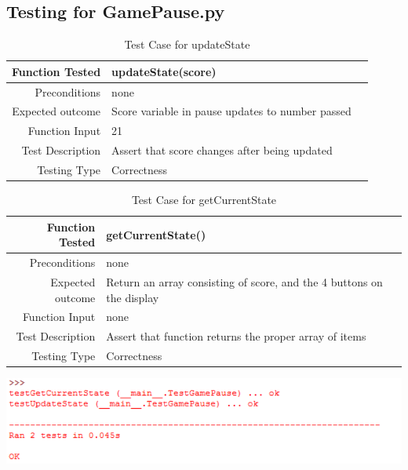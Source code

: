 \documentclass[12pt]{article}
\begin{document}
\subsection{Testing for GamePause.py}
\begin{center}
	\begin{longtable}{ | r | p{4cm} | p{4cm} }
	\caption{Test Case for updateState} \\ \hline \label{TblInputVar} 
	Function Tested & updateState(score)\\ \hline
	Preconditions & none \\ \hline
	Expected outcome & Score variable in pause updates to number passed  \\ \hline
	Function Input & 21 \\ \hline
	Test Description & Assert that score changes after being updated\\ \hline
	Testing Type & Correctness\\ \hline
	
	\end{longtable}
\end{center}

\begin{center}
	\begin{longtable}{ | r | p{4cm} | p{4cm} }
	\caption{Test Case for getCurrentState} \\ \hline \label{TblInputVar} 
	Function Tested & getCurrentState()\\ \hline
	Preconditions & none \\ \hline
	Expected outcome & Return an array consisting of score, and the 4 buttons on the display  \\ \hline
	Function Input & none \\ \hline
	Test Description & Assert that function returns the proper array of items \\ \hline
	Testing Type & Correctness\\ \hline
	
	\end{longtable}
\includegraphics{testGamePauseResults}\newline\newline
\end{center}
\end{document}
